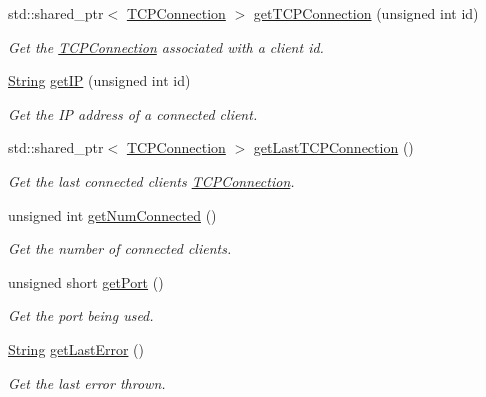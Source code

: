 \begin{DoxyCompactItemize}
std\+::shared\+\_\+ptr$<$ \hyperlink{class_rad_j_a_v_1_1_networking_1_1_t_c_p_connection}{T\+C\+P\+Connection} $>$ \hyperlink{class_rad_j_a_v_1_1_networking_1_1_tcpip_server_a237daa6d6defd83bf690017edeea28ce}{get\+T\+C\+P\+Connection} (unsigned int id)
\begin{DoxyCompactList}\small\item\em Get the \hyperlink{class_rad_j_a_v_1_1_networking_1_1_t_c_p_connection}{T\+C\+P\+Connection} associated with a client id. \end{DoxyCompactList}\item 
\hyperlink{class_rad_j_a_v_1_1_string}{String} \hyperlink{class_rad_j_a_v_1_1_networking_1_1_tcpip_server_afd97d2780d61004d2a790f7f63cc4ed7}{get\+IP} (unsigned int id)
\begin{DoxyCompactList}\small\item\em Get the IP address of a connected client. \end{DoxyCompactList}\item 
std\+::shared\+\_\+ptr$<$ \hyperlink{class_rad_j_a_v_1_1_networking_1_1_t_c_p_connection}{T\+C\+P\+Connection} $>$ \hyperlink{class_rad_j_a_v_1_1_networking_1_1_tcpip_server_ab3161184633ef9072ba431ca45c408a9}{get\+Last\+T\+C\+P\+Connection} ()
\begin{DoxyCompactList}\small\item\em Get the last connected client\textquotesingle{}s \hyperlink{class_rad_j_a_v_1_1_networking_1_1_t_c_p_connection}{T\+C\+P\+Connection}. \end{DoxyCompactList}\item 
unsigned int \hyperlink{class_rad_j_a_v_1_1_networking_1_1_tcpip_server_a84eba14d877a68c241487cfc0a6d9031}{get\+Num\+Connected} ()
\begin{DoxyCompactList}\small\item\em Get the number of connected clients. \end{DoxyCompactList}\item 
unsigned short \hyperlink{class_rad_j_a_v_1_1_networking_1_1_tcpip_server_a27aecbe03f731d38e635dc1e8cbe7130}{get\+Port} ()
\begin{DoxyCompactList}\small\item\em Get the port being used. \end{DoxyCompactList}\item 
\hyperlink{class_rad_j_a_v_1_1_string}{String} \hyperlink{class_rad_j_a_v_1_1_networking_1_1_tcpip_server_a08fbc1566fc5e913bccdb1d4e392bdd5}{get\+Last\+Error} ()
\begin{DoxyCompactList}\small\item\em Get the last error thrown. \end{DoxyCompactList}\item 

\end{DoxyCompactItemize}
